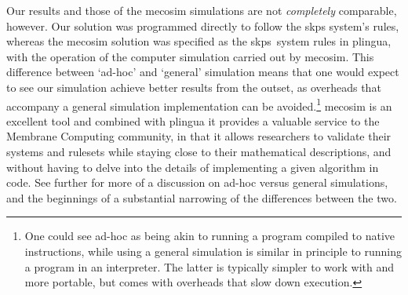 Our results and those of the \gls{mecosim} simulations are not \emph{completely} comparable, however.  Our solution was programmed directly to follow the \gls{skps} system's rules, whereas the \gls{mecosim} solution was specified as the \gls{skps}~system rules in \gls{plingua}, with the operation of the computer simulation carried out by \gls{mecosim}.  This difference between `ad-hoc' and `general' simulation means that one would expect to see our simulation achieve better results from the outset, as overheads that accompany a general simulation implementation can be avoided.\footnote{One could see ad-hoc as being akin to running a program compiled to native instructions, while using a general simulation is similar in principle to running a program in an interpreter.  The latter is typically simpler to work with and more portable, but comes with overheads that slow down execution.}  \gls{mecosim} is an excellent tool and combined with \gls{plingua} it provides a valuable service to the Membrane Computing community, in that it allows researchers to validate their systems and rulesets while staying close to their mathematical descriptions, and without having to delve into the details of implementing a given algorithm in code.  See further \cite{Perez-Hurtado2018} for more of a discussion on ad-hoc versus general simulations, and the beginnings of a substantial narrowing of the differences between the two.